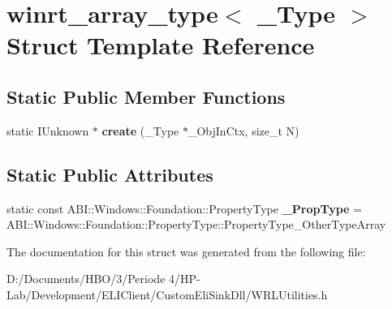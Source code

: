 \hypertarget{structwinrt__array__type}{}\section{winrt\+\_\+array\+\_\+type$<$ \+\_\+\+Type $>$ Struct Template Reference}
\label{structwinrt__array__type}
\subsection*{Static Public Member Functions}
\begin{DoxyCompactItemize}
\item 
\mbox{\label{structwinrt__array__type_a781e4f54bfb8f72d64ff7491e6ff39a5}} 
static I\+Unknown $\ast$ {\bfseries create} (\+\_\+\+Type $\ast$\+\_\+\+Obj\+In\+Ctx, size\+\_\+t N)
\end{DoxyCompactItemize}
\subsection*{Static Public Attributes}
\begin{DoxyCompactItemize}
\item 
\mbox{\label{structwinrt__array__type_a1ae940bf1daf6a3d24e8cca1df0a4bb2}} 
static const A\+B\+I\+::\+Windows\+::\+Foundation\+::\+Property\+Type {\bfseries \+\_\+\+Prop\+Type} = A\+B\+I\+::\+Windows\+::\+Foundation\+::\+Property\+Type\+::\+Property\+Type\+\_\+\+Other\+Type\+Array
\end{DoxyCompactItemize}


The documentation for this struct was generated from the following file\+:\begin{DoxyCompactItemize}
\item 
D\+:/\+Documents/\+H\+B\+O/3/\+Periode 4/\+H\+P-\/\+Lab/\+Development/\+E\+L\+I\+Client/\+Custom\+Eli\+Sink\+Dll/W\+R\+L\+Utilities.\+h\end{DoxyCompactItemize}
